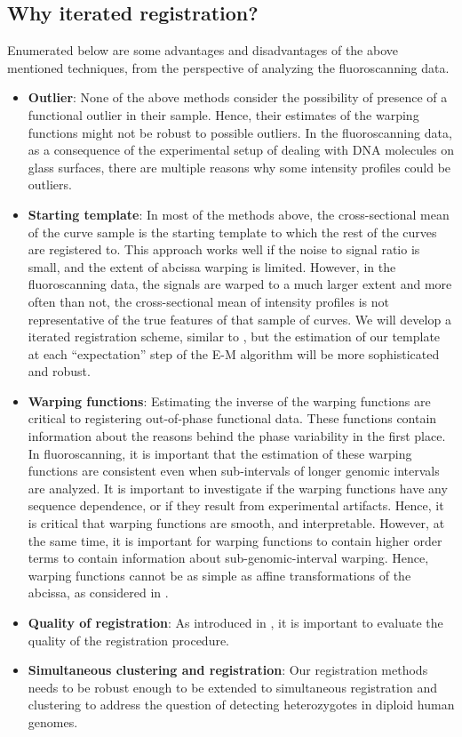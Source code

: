 \subsection{Why iterated registration?}
Enumerated below are some advantages and disadvantages of the above mentioned techniques, from the perspective of analyzing the fluoroscanning data.
\begin{itemize}
\item {\bf{Outlier}}: None of the above methods consider the possibility of presence of a functional outlier in their sample. Hence, their estimates of the warping functions might not be robust to possible outliers. In the fluoroscanning data, as a consequence of the experimental setup of dealing with DNA molecules on glass surfaces, there are multiple reasons why some intensity profiles could be outliers. 

\item {\bf{Starting template}}: In most of the methods above, the cross-sectional mean of the curve sample is the starting template to which the rest of the curves are registered to. This approach works well if the noise to signal ratio is small, and the extent of abcissa warping is limited. However, in the fluoroscanning data, the signals are warped to a much larger extent and more often than not, the cross-sectional mean of intensity profiles is not representative of the true features of that sample of curves. We will develop a iterated registration scheme, similar to \cite{Sangalli_etal_2009_JASA}, but the estimation of our template at each ``expectation'' step of the E-M algorithm will be more sophisticated and robust.

\item {\bf{Warping functions}}: Estimating the inverse of the warping functions are critical to registering out-of-phase functional data. These functions contain information about the reasons behind the phase variability in the first place. In fluoroscanning, it is important that the estimation of these warping functions are consistent even when sub-intervals of longer genomic intervals are analyzed. It is important to investigate if the warping functions have any sequence dependence, or if they result from experimental artifacts. Hence, it is critical that warping functions are smooth, and interpretable. However, at the same time, it is important for warping functions to contain higher order terms to contain information about sub-genomic-interval warping. Hence, warping functions cannot be as simple as affine transformations of the abcissa, as considered in \cite{Sangalli_etal_2009_JASA}. 

\item {\bf{Quality of registration}}: As introduced in \cite{Sangalli_etal_2009_JASA}, it is important to evaluate the quality of the registration procedure. 

\item {\bf{Simultaneous clustering and registration}}: Our registration methods needs to be robust enough to be extended to simultaneous registration and clustering to address the question of detecting heterozygotes in diploid human genomes.  
\end{itemize}

